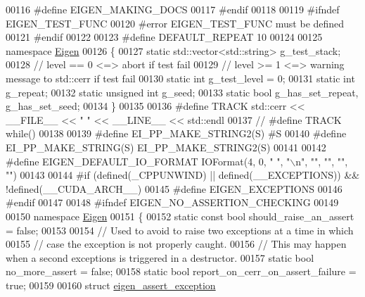 \begin{DoxyCode}
00116 \textcolor{preprocessor}{#define EIGEN\_MAKING\_DOCS}
00117 \textcolor{preprocessor}{#endif}
00118 
00119 \textcolor{preprocessor}{#ifndef EIGEN\_TEST\_FUNC}
00120 \textcolor{preprocessor}{#error EIGEN\_TEST\_FUNC must be defined}
00121 \textcolor{preprocessor}{#endif}
00122 
00123 \textcolor{preprocessor}{#define DEFAULT\_REPEAT 10}
00124 
00125 \textcolor{keyword}{namespace }\hyperlink{namespace_eigen}{Eigen}
00126 \{
00127   \textcolor{keyword}{static} std::vector<std::string> g\_test\_stack;
00128   \textcolor{comment}{// level == 0 <=> abort if test fail}
00129   \textcolor{comment}{// level >= 1 <=> warning message to std::cerr if test fail}
00130   \textcolor{keyword}{static} \textcolor{keywordtype}{int} g\_test\_level = 0;
00131   \textcolor{keyword}{static} \textcolor{keywordtype}{int} g\_repeat;
00132   \textcolor{keyword}{static} \textcolor{keywordtype}{unsigned} \textcolor{keywordtype}{int} g\_seed;
00133   \textcolor{keyword}{static} \textcolor{keywordtype}{bool} g\_has\_set\_repeat, g\_has\_set\_seed;
00134 \}
00135 
00136 \textcolor{preprocessor}{#define TRACK std::cerr << \_\_FILE\_\_ << " " << \_\_LINE\_\_ << std::endl}
00137 \textcolor{comment}{// #define TRACK while()}
00138 
00139 \textcolor{preprocessor}{#define EI\_PP\_MAKE\_STRING2(S) #S}
00140 \textcolor{preprocessor}{#define EI\_PP\_MAKE\_STRING(S) EI\_PP\_MAKE\_STRING2(S)}
00141 
00142 \textcolor{preprocessor}{#define EIGEN\_DEFAULT\_IO\_FORMAT IOFormat(4, 0, "  ", "\(\backslash\)n", "", "", "", "")}
00143 
00144 \textcolor{preprocessor}{#if (defined(\_CPPUNWIND) || defined(\_\_EXCEPTIONS)) && !defined(\_\_CUDA\_ARCH\_\_)}
00145 \textcolor{preprocessor}{  #define EIGEN\_EXCEPTIONS}
00146 \textcolor{preprocessor}{#endif}
00147 
00148 \textcolor{preprocessor}{#ifndef EIGEN\_NO\_ASSERTION\_CHECKING}
00149 
00150   \textcolor{keyword}{namespace }\hyperlink{namespace_eigen}{Eigen}
00151   \{
00152     \textcolor{keyword}{static} \textcolor{keyword}{const} \textcolor{keywordtype}{bool} should\_raise\_an\_assert = \textcolor{keyword}{false};
00153 
00154     \textcolor{comment}{// Used to avoid to raise two exceptions at a time in which}
00155     \textcolor{comment}{// case the exception is not properly caught.}
00156     \textcolor{comment}{// This may happen when a second exceptions is triggered in a destructor.}
00157     \textcolor{keyword}{static} \textcolor{keywordtype}{bool} no\_more\_assert = \textcolor{keyword}{false};
00158     \textcolor{keyword}{static} \textcolor{keywordtype}{bool} report\_on\_cerr\_on\_assert\_failure = \textcolor{keyword}{true};
00159 
00160     \textcolor{keyword}{struct }\hyperlink{struct_eigen_1_1eigen__assert__exception}{eigen\_assert\_exception}

\end{DoxyCode}
